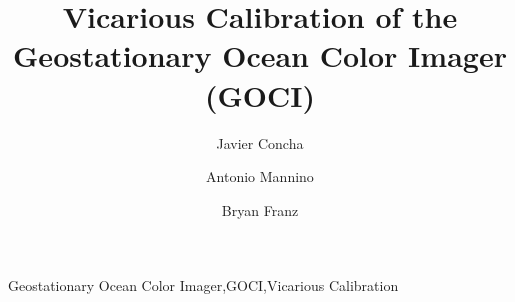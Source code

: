 \documentclass[onecolumn,3p,letterpaper,11pt]{elsarticle}
\begin{document}

\begin{frontmatter}

\title{Vicarious Calibration of the Geostationary Ocean Color Imager (GOCI)}


\author[oeladdress,usraaddress]{Javier Concha}

\author[oeladdress]{Antonio Mannino}

\author[oeladdress]{Bryan Franz}




\address[oeladdress]{Ocean Ecology Lab, NASA Goddard Space Flight Center, Greenbelt, MD, USA}
\address[usraaddress]{Universities Space Research Association, Columbia, MD, USA}

\begin{abstract}


%
 

% 


%
 
%

%

%


%
 

%


\end{abstract}

\begin{keyword}
Geostationary Ocean Color Imager\sep GOCI\sep Vicarious Calibration
\end{keyword}

\end{frontmatter}
\singlespacing
\small
\tableofcontents
\normalsize
\doublespacing
\end{document}
